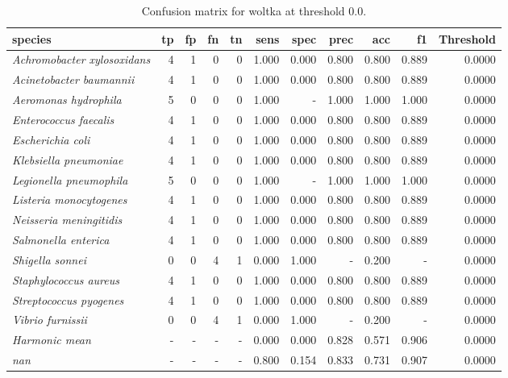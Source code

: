 \begin{table}[H]
\centering
\begin{tabular}{lrrrrrrrrrr}
\hline
\textbf{species} & \textbf{tp} & \textbf{fp} & \textbf{fn} & \textbf{tn} & \textbf{sens} & \textbf{spec} & \textbf{prec} & \textbf{acc} & \textbf{f1} & \textbf{Threshold} \\
\hline
\itshape Achromobacter xylosoxidans & 4 & 1 & 0 & 0 & 1.000 & 0.000 & 0.800 & 0.800 & 0.889 & 0.0000 \\
\itshape Acinetobacter baumannii & 4 & 1 & 0 & 0 & 1.000 & 0.000 & 0.800 & 0.800 & 0.889 & 0.0000 \\
\itshape Aeromonas hydrophila & 5 & 0 & 0 & 0 & 1.000 & - & 1.000 & 1.000 & 1.000 & 0.0000 \\
\itshape Enterococcus faecalis & 4 & 1 & 0 & 0 & 1.000 & 0.000 & 0.800 & 0.800 & 0.889 & 0.0000 \\
\itshape Escherichia coli & 4 & 1 & 0 & 0 & 1.000 & 0.000 & 0.800 & 0.800 & 0.889 & 0.0000 \\
\itshape Klebsiella pneumoniae & 4 & 1 & 0 & 0 & 1.000 & 0.000 & 0.800 & 0.800 & 0.889 & 0.0000 \\
\itshape Legionella pneumophila & 5 & 0 & 0 & 0 & 1.000 & - & 1.000 & 1.000 & 1.000 & 0.0000 \\
\itshape Listeria monocytogenes & 4 & 1 & 0 & 0 & 1.000 & 0.000 & 0.800 & 0.800 & 0.889 & 0.0000 \\
\itshape Neisseria meningitidis & 4 & 1 & 0 & 0 & 1.000 & 0.000 & 0.800 & 0.800 & 0.889 & 0.0000 \\
\itshape Salmonella enterica & 4 & 1 & 0 & 0 & 1.000 & 0.000 & 0.800 & 0.800 & 0.889 & 0.0000 \\
\itshape Shigella sonnei & 0 & 0 & 4 & 1 & 0.000 & 1.000 & - & 0.200 & - & 0.0000 \\
\itshape Staphylococcus aureus & 4 & 1 & 0 & 0 & 1.000 & 0.000 & 0.800 & 0.800 & 0.889 & 0.0000 \\
\itshape Streptococcus pyogenes & 4 & 1 & 0 & 0 & 1.000 & 0.000 & 0.800 & 0.800 & 0.889 & 0.0000 \\
\itshape Vibrio furnissii & 0 & 0 & 4 & 1 & 0.000 & 1.000 & - & 0.200 & - & 0.0000 \\
\itshape Harmonic mean & - & - & - & - & 0.000 & 0.000 & 0.828 & 0.571 & 0.906 & 0.0000 \\
\itshape nan & - & - & - & - & 0.800 & 0.154 & 0.833 & 0.731 & 0.907 & 0.0000 \\
\end{tabular}
\caption{Confusion matrix for woltka at threshold 0.0.}
\label{tab:conf_woltka_0.0}
\end{table}
